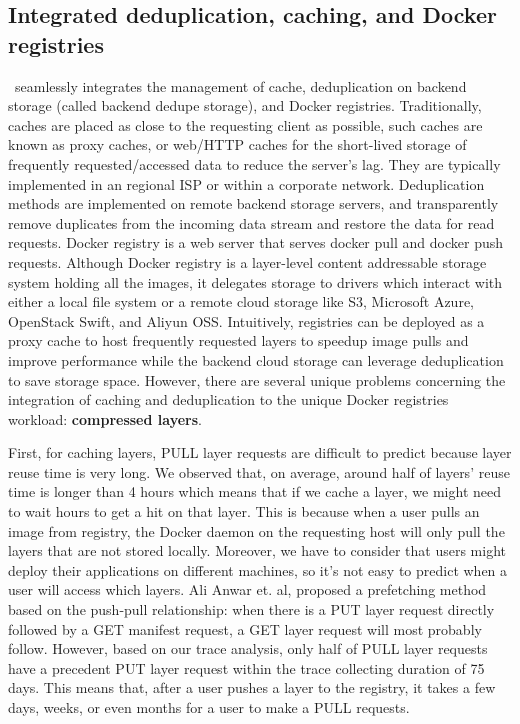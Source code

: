 \subsection{Integrated deduplication, caching, and Docker registries}
\label{sec:design}

%

%
%
%

\sysname~seamlessly integrates the management of cache, deduplication on backend storage (called backend dedupe storage), and Docker registries.
Traditionally, caches are placed as close to the requesting client as possible, 
such caches are known as proxy caches, or web/HTTP caches for the short-lived storage of 
frequently requested/accessed data to reduce the server's lag. 
They are typically implemented in an regional ISP or within a corporate network.
Deduplication methods are implemented on remote backend storage servers, and
transparently remove duplicates from the incoming data stream and restore the data for read requests. 
Docker registry is a web server that serves docker pull and docker push requests.
Although Docker registry is a layer-level content addressable storage system holding all the images,
it delegates storage to drivers which interact with either a local file system or a remote cloud storage like S3, Microsoft Azure, OpenStack Swift, and Aliyun OSS.
Intuitively, registries can be deployed as a proxy cache to host frequently requested layers to speedup image pulls and improve performance 
while the backend cloud storage can leverage deduplication to save storage space.
However, there are several unique problems concerning the integration of caching and deduplication to the unique Docker registries workload: \textbf{compressed layers}. 

First, for caching layers, PULL layer requests are difficult to predict because layer reuse time is very long. 
We observed that, on average, around half of layers' reuse time is longer than 4 hours which means 
that if we cache a layer, we might need to wait hours to get a hit on that layer.
This is because when a user pulls an image from registry, the Docker daemon on the requesting host will only pull the layers that are not stored locally. 
Moreover, we have to consider that users might deploy their applications on different machines, so it's not easy to predict 
when a user will access which layers.
Ali Anwar et. al, proposed a prefetching method~\cite{dockerworkload} based on the push-pull relationship: 
when there is a PUT layer request directly followed by a GET manifest request, a GET layer request will most probably follow.
However, based on our trace analysis, only half of PULL layer requests have a precedent PUT layer request within the trace collecting duration of 75 days. 
This means that,
after a user pushes a layer to the registry, it takes a few days, weeks, or even months for a user to make a PULL requests.

